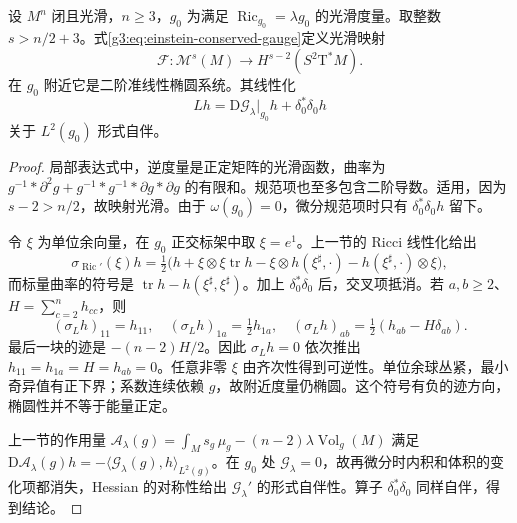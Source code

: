\begin{theorem}\label{g3:thm:einstein-gauged-ellipticity}
	设 \(M^n\) 闭且光滑，\(n\ge3\)，\(g_0\) 为满足 \(\operatorname{Ric}_{g_0}=\lambda g_0\) 的光滑度量。取整数 \(s>n/2+3\)。式\eqref{g3:eq:einstein-conserved-gauge}定义光滑映射
	\[
		\mathcal F:\mathcal M^s(M)\longrightarrow
		H^{s-2}(S^2\mathrm T^*M).
	\]
	在 \(g_0\) 附近它是二阶准线性椭圆系统。其线性化
	\begin{equation}\label{g3:eq:einstein-gauged-linearization}
		Lh=\mathrm D\mathcal G_\lambda|_{g_0}h+\delta_0^*\delta_0h
	\end{equation}
	关于 \(L^2(g_0)\) 形式自伴。
\end{theorem}
\begin{proof}
	局部表达式中，逆度量是正定矩阵的光滑函数，曲率为 \(g^{-1}*\partial^2g+g^{-1}*g^{-1}*\partial g*\partial g\) 的有限和。规范项也至多包含二阶导数。适用，因为 \(s-2>n/2\)，故映射光滑。由于 \(\omega(g_0)=0\)，微分规范项时只有 \(\delta_0^*\delta_0h\) 留下。

	令 \(\xi\) 为单位余向量，在 \(g_0\) 正交标架中取 \(\xi=e^1\)。上一节的 Ricci 线性化给出
	\[
		\sigma_{\operatorname{Ric}'}(\xi)h
		=\tfrac12\bigl(h+\xi\otimes\xi\operatorname{tr}h
		-\xi\otimes h(\xi^\sharp,\cdot)-h(\xi^\sharp,\cdot)\otimes\xi\bigr),
	\]
	而标量曲率的符号是 \(\operatorname{tr}h-h(\xi^\sharp,\xi^\sharp)\)。加上 \(\delta_0^*\delta_0\) 后，交叉项抵消。若 \(a,b\ge2\)、\(H=\sum_{c=2}^nh_{cc}\)，则
	\begin{equation}\label{g3:eq:einstein-gauge-block-symbol}
		(\sigma_Lh)_{11}=h_{11},\quad
		(\sigma_Lh)_{1a}=\tfrac12h_{1a},\quad
		(\sigma_Lh)_{ab}=\tfrac12(h_{ab}-H\delta_{ab}).
	\end{equation}
	最后一块的迹是 \(-(n-2)H/2\)。因此 \(\sigma_Lh=0\) 依次推出 \(h_{11}=h_{1a}=H=h_{ab}=0\)。任意非零 \(\xi\) 由齐次性得到可逆性。单位余球丛紧，最小奇异值有正下界；系数连续依赖 \(g\)，故附近度量仍椭圆。这个符号有负的迹方向，椭圆性并不等于能量正定。

	上一节的作用量 \(\mathcal A_\lambda(g)=\int_Ms_g\,\mu_g-(n-2)\lambda\operatorname{Vol}_g(M)\) 满足
	\(\mathrm D\mathcal A_\lambda(g)h=-\langle\mathcal G_\lambda(g),h\rangle_{L^2(g)}\)。在 \(g_0\) 处 \(\mathcal G_\lambda=0\)，故再微分时内积和体积的变化项都消失，Hessian 的对称性给出 \(\mathcal G_\lambda'\) 的形式自伴性。算子 \(\delta_0^*\delta_0\) 同样自伴，得到结论。
\end{proof}

